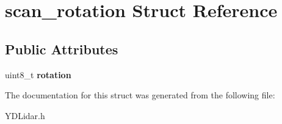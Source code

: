 \hypertarget{structscan__rotation}{}\section{scan\+\_\+rotation Struct Reference}
\label{structscan__rotation}
\subsection*{Public Attributes}
\begin{DoxyCompactItemize}
\item 
uint8\+\_\+t {\bfseries rotation}\hypertarget{structscan__rotation_a22cb3689e04952bbd07cdac97ecad4a0}{}\label{structscan__rotation_a22cb3689e04952bbd07cdac97ecad4a0}

\end{DoxyCompactItemize}


The documentation for this struct was generated from the following file\+:\begin{DoxyCompactItemize}
\item 
Y\+D\+Lidar.\+h\end{DoxyCompactItemize}
